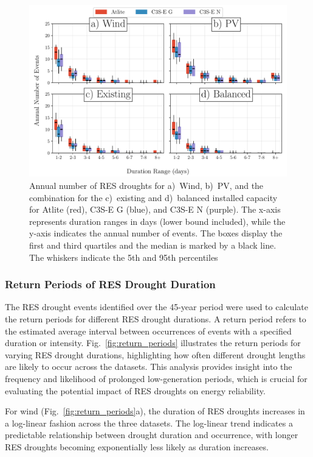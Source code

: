 \documentclass[a4paper, 11pt]{article}
\begin{document}
\begin{figure}[!ht]
	\centering
	\includegraphics[width=\textwidth]{droughts_number_events}
	\caption{Annual number of RES droughts for a)~Wind, b)~PV, and the combination for the c)~existing and d)~balanced installed capacity for Atlite (red), C3S-E G (blue), and C3S-E N (purple). The x-axis represents duration ranges in days (lower bound included), while the y-axis indicates the annual number of events. The boxes display the first and third quartiles and the median is marked by a black line. The whiskers indicate the 5th and 95th percentiles}
	\label{fig:boxplot_number_events}	
\end{figure}

\newpage
\subsubsection{Return Periods of RES Drought Duration}

The RES drought events identified over the 45-year period were used to calculate the return periods for different RES drought durations. A return period refers to the estimated average interval between occurrences of events with a specified duration or intensity. Fig.~\ref{fig:return_periods} illustrates the return periods for varying RES drought durations, highlighting how often different drought lengths are likely to occur across the datasets. This analysis provides insight into the frequency and likelihood of prolonged low-generation periods, which is crucial for evaluating the potential impact of RES droughts on energy reliability.

For wind (Fig.~\ref{fig:return_periods}a), the duration of RES droughts increases in a log-linear fashion across the three datasets. The log-linear trend indicates a predictable relationship between drought duration and occurrence, with longer RES droughts becoming exponentially less likely as duration increases. 
\end{document}
